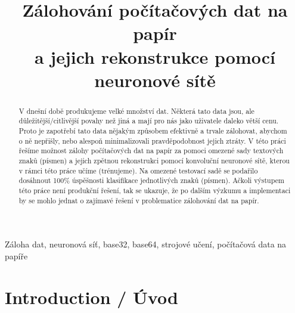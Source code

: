 \documentclass[conference]{IEEEtran}
\begin{document}
\title{Zálohování počítačových dat na papír\\ a jejich rekonstrukce pomocí neuronové sítě}

\author{
}

\maketitle

\begin{abstract}

V dnešní době produkujeme velké množství dat. Některá tato data jsou, ale důležitější/citlivější povahy než jiná a mají pro nás jako uživatele daleko větší cenu. Proto je zapotřebí tato data nějakým způsobem efektivně a trvale zálohovat, abychom o ně nepřišly, nebo alespoň minimalizovali pravděpodobnost jejich ztráty. V této práci řešíme možnost zálohy počítačových dat na papír za pomoci omezené sady textových znaků (písmen) a jejich zpětnou rekonstrukci pomocí konvoluční neuronové sítě, kterou v rámci této práce učíme (trénujeme). Na omezené testovací sadě se podařilo dosáhnout 100\% úspěšnosti klasifikace jednotlivých znaků (písmen). Ačkoli výstupem této práce není produkční řešení, tak se ukazuje, že po dalším výzkumu a implementaci by se mohlo jednat o zajímavé řešení v problematice zálohování dat na papír.

\end{abstract}

\vspace{5mm}

\begin{IEEEkeywords}
	Záloha dat, neuronová síť, base32, base64, strojové učení, počítačová data na papíře
\end{IEEEkeywords}

\IEEEpeerreviewmaketitle

\section{Introduction / Úvod}
\end{document}
